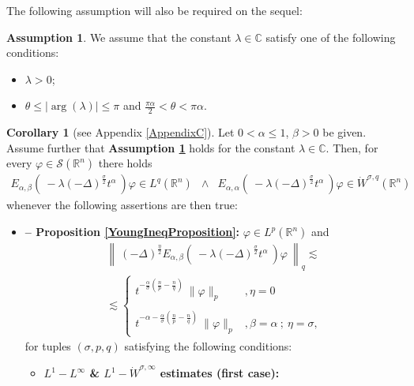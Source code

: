 \documentclass{amsart}
\theoremstyle{definition}
\newtheorem{corollary}[theorem]{Corollary}
\newtheorem{assumption}[theorem]{Assumption}
\theoremstyle{remark}
\numberwithin{equation}{section}
\newcommand{\BR}{{\mathbb R}}
\begin{document}
The following assumption will also be required on the sequel:
\begin{assumption}\label{AssumptionLambda}
	We assume that the constant $\lambda\in \mathbb{C}$ satisfy one of the following conditions:
	\begin{itemize}
		\item[\bf (a)] $\lambda>0$;
		\item[\bf (b)] $\theta \leq |\arg(\lambda)|\leq \pi$ and $\frac{\pi\alpha}{2}<\theta<\pi \alpha$.
	\end{itemize}
\end{assumption}

\begin{corollary}[see Appendix {\ref{AppendixC}}]\label{DispersiveCorollary} Let $0<\alpha\leq 1$, $\beta>0$ be given. Assume further that {\bf Assumption \ref{AssumptionLambda}} holds for the constant $\lambda\in \mathbb{C}$.
	Then, for every $\varphi\in \mathcal{S}(\BR^n)$ there holds  \begin{eqnarray*}
		E_{\alpha,\beta}\left(~-\lambda (-\Delta)^{\frac{\sigma}{2}} t^{\alpha}~\right)\varphi \in L^q(\BR^n)&\wedge&E_{\alpha,\alpha}\left(~-\lambda (-\Delta)^{\frac{\sigma}{2}} t^{\alpha}~\right)\varphi \in \dot{W}^{\sigma,q}(\BR^n)
	\end{eqnarray*} 
	whenever the following assertions are then true:
	\begin{itemize}
		\item[\bf (1)] {\bf -- Proposition \ref{YoungIneqProposition}:} $\varphi\in L^p(\BR^n)$ and 	\begin{eqnarray}
			\label{CaseIEstimates}
			\left\|~ (-\Delta)^{\frac{\eta}{2}}E_{\alpha,\beta}\left(~-\lambda(-\Delta)^{\frac{\sigma}{2}} t^\alpha~\right)\varphi~\right\|_q \lesssim \nonumber \\  \lesssim \begin{cases}
				\displaystyle t^{-\frac{\alpha }{\sigma}\left(\frac{n}{p}-\frac{n}{q}\right)}~
				\|\varphi\|_p &, \eta=0\\  \ \\
				\displaystyle t^{-\alpha-\frac{\alpha }{\sigma}\left(\frac{n}{p}-\frac{n}{q}\right)}~
				\|\varphi\|_p &, \beta=\alpha~;~\eta=\sigma,
			\end{cases} 
		\end{eqnarray} 
		for tuples $(\sigma,p,q)$ satisfying the following conditions:
		\begin{itemize}
			\item[{\bf (a)}] {\bf $L^1-L^\infty$ \& $L^1-\dot{W}^{\sigma,\infty}$ estimates (first case):} 

\end{itemize}
\end{itemize}
\end{corollary}
\end{document}
